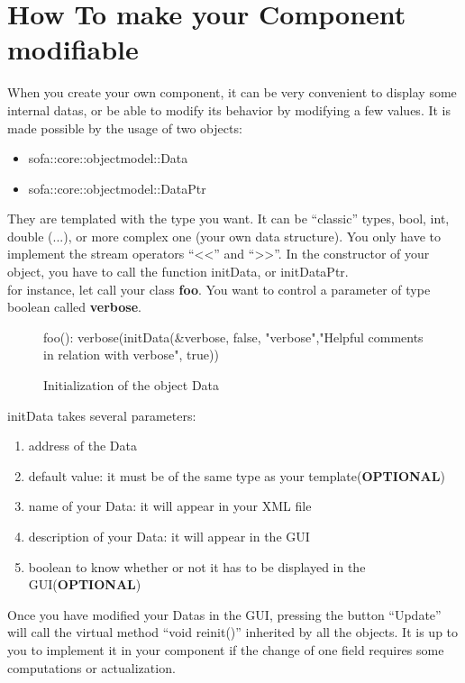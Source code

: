 
\section{How To make your Component modifiable}
When you create your own component, it can be very convenient to display some internal datas, or be able to modify its behavior by modifying a few values. It is made possible by the usage of two objects:
\begin{itemize}
 \item sofa::core::objectmodel::Data
 \item sofa::core::objectmodel::DataPtr
\end{itemize}
They are templated with the type you want. It can be ``classic'' types, bool, int, double (...), or more complex one (your own data structure). You only have to implement the stream operators ``<<'' and ``>>''. In the constructor of your object, you have to call the function initData, or initDataPtr. 
\\
for instance, let call your class  {\bf foo}. You want to control a parameter of type boolean called {\bf verbose}.
\begin{figure}
\begin{code_cpp}
     foo(): verbose(initData(&verbose, false, "verbose","Helpful comments in relation with verbose", true))	
{
}
\end{code_cpp}
\caption{Initialization of the object Data}
\end{figure}
initData takes several parameters: 
\begin{enumerate}
 \item address of the Data
 \item default value: it must be of the same type as your template({\bf OPTIONAL})
 \item name of your Data: it will appear in your XML file
 \item description of your Data: it will appear in the GUI
 \item boolean to know whether or not it has to be displayed in the GUI({\bf OPTIONAL})
\end{enumerate}

 Once you have modified your Datas in the GUI, pressing the button ``Update'' will call the virtual method ``void reinit()'' inherited by all the objects. It is up to you to implement it in your component if the change of one field requires some computations or actualization.

